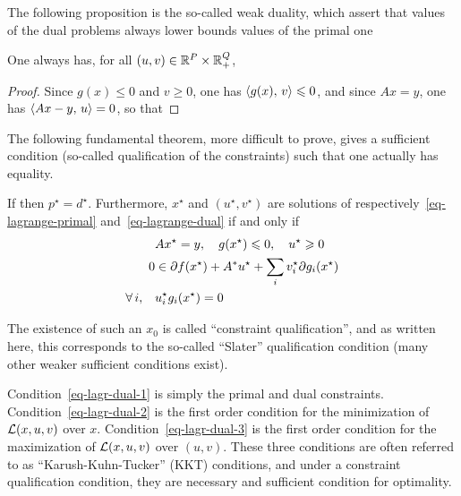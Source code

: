 The following proposition is the so-called weak duality, which assert that values of the dual problems always lower bounds values of the primal one

\begin{prop}
	One always has, for all $(u,v) \in \mathbb{R}^P \times \mathbb{R}_+^Q$, %
\end{prop}
\begin{proof}
	Since $g(x) \leq 0 $ and $v \geq 0$, one has $\langle g(x),\,v\rangle \leqslant 0$, and since $Ax=y$, one has $\langle Ax-y,\,u\rangle=0$, so that 
\end{proof}

The following fundamental theorem, more difficult to prove, gives a sufficient condition (so-called qualification of the constraints) such that one actually has equality.

\begin{thm}\label{thm-strong-duality}
	If 
	then $p^\star=d^\star$. Furthermore, $x^\star$ and $(u^\star,v^\star)$ are  solutions of respectively~\eqref{eq-lagrange-primal} and~\eqref{eq-lagrange-dual} if and only if
	\begin{align}
		\label{eq-lagr-dual-1}  & Ax^\star=y, \quad g(x^\star) \leqslant 0, \quad u^\star \geqslant 0 \\
		\label{eq-lagr-dual-2} 0 &\in \partial f(x^\star) + A^*u^\star + \sum_i v_i^\star \partial g_i(x^\star) \\
		\label{eq-lagr-dual-3}  \forall \, i, \quad & u_i^\star g_i(x^\star) = 0
	\end{align}
\end{thm}

The existence of such an $x_0$ is called ``constraint qualification'', and as written here, this corresponds to the so-called ``Slater'' qualification condition (many other weaker sufficient conditions exist). 

Condition~\eqref{eq-lagr-dual-1} is simply the primal and dual constraints. 
%
Condition~\eqref{eq-lagr-dual-2} is the first order condition for the minimization of $\mathcal{L}(x,u,v)$ over $x$.
%
Condition~\eqref{eq-lagr-dual-3} is the first order condition for the maximization of $\mathcal{L}(x,u,v)$ over $(u,v)$.
%
These three conditions are often referred to as ``Karush-Kuhn-Tucker'' (KKT) conditions, and under a constraint qualification condition, they are necessary and sufficient condition for optimality. 


